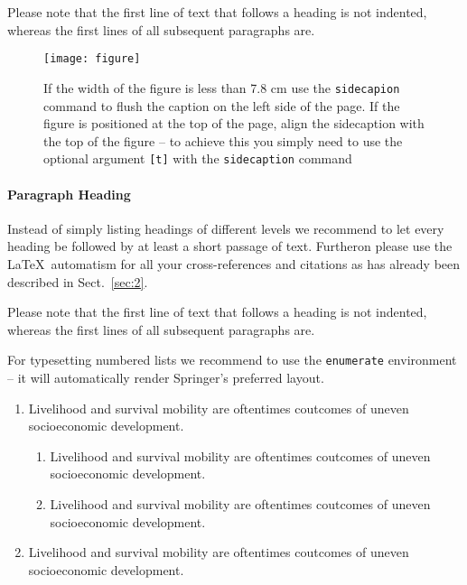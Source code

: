 Please note that the first line of text that follows a heading is not indented, whereas the first lines of all subsequent paragraphs are.

%
\begin{figure}[b]
\sidecaption
\texttt{[image: figure]}
%
%
\caption{If the width of the figure is less than 7.8 cm use the \texttt{sidecapion} command to flush the caption on the left side of the page. If the figure is positioned at the top of the page, align the sidecaption with the top of the figure -- to achieve this you simply need to use the optional argument \texttt{[t]} with the \texttt{sidecaption} command}
\label{fig:1}       %
\end{figure}


\paragraph{Paragraph Heading} %
Instead of simply listing headings of different levels we recommend to let every heading be followed by at least a short passage of text. Furtheron please use the \LaTeX\ automatism for all your cross-references and citations as has already been described in Sect.~\ref{sec:2}.

Please note that the first line of text that follows a heading is not indented, whereas the first lines of all subsequent paragraphs are.

For typesetting numbered lists we recommend to use the \verb|enumerate| environment -- it will automatically render Springer's preferred layout.

\begin{enumerate}
\item{Livelihood and survival mobility are oftentimes coutcomes of uneven socioeconomic development.}
\begin{enumerate}
\item{Livelihood and survival mobility are oftentimes coutcomes of uneven socioeconomic development.}
\item{Livelihood and survival mobility are oftentimes coutcomes of uneven socioeconomic development.}
\end{enumerate}
\item{Livelihood and survival mobility are oftentimes coutcomes of uneven socioeconomic development.}
\end{enumerate}


